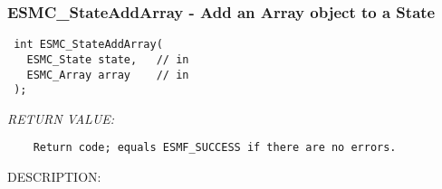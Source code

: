  
\setlength{\oldparskip}{\parskip}
\setlength{\parskip}{1.5ex}
\setlength{\oldparindent}{\parindent}
\setlength{\parindent}{0pt}
\setlength{\oldbaselineskip}{\baselineskip}
\setlength{\baselineskip}{11pt}
 
\def\bv{\begin{verbatim}}
\def\ev{\end{verbatim}}
\def\be{\begin{equation}}
\def\ee{\end{equation}}
\def\bea{\begin{eqnarray}}
\def\eea{\end{eqnarray}}
\def\bi{\begin{itemize}}
\def\ei{\end{itemize}}
\def\bn{\begin{enumerate}}
\def\en{\end{enumerate}}
\def\bd{\begin{description}}
\def\ed{\end{description}}
\def\({\left (}
\def\){\right )}
\def\[{\left [}
\def\]{\right ]}
\def\<{\left  \langle}
\def\>{\right \rangle}
\def\cI{{\cal I}}
\def\diag{\mathop{\rm diag}}
\def\tr{\mathop{\rm tr}}


 
\subsubsection [ESMC\_StateAddArray] {ESMC\_StateAddArray - Add an Array object to a State}


  
\begin{verbatim} int ESMC_StateAddArray(
   ESMC_State state,   // in
   ESMC_Array array    // in
 );\end{verbatim}{\em RETURN VALUE:}
\begin{verbatim}    Return code; equals ESMF_SUCCESS if there are no errors.\end{verbatim}
{\sf DESCRIPTION:\\ }


